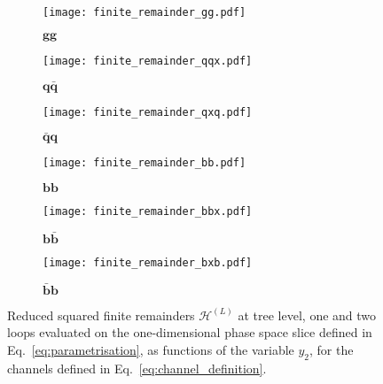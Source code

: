 \documentclass[main.tex]{subfiles}
\begin{document}
\begin{figure}[t!]
\centering
\begin{subfigure}{.5\textwidth}
    \centering
    \texttt{[image: finite\_remainder\_gg.pdf]}
    \label{fig:gg}
    \caption{$\mathbf{gg}$}
\end{subfigure}%
\begin{subfigure}{.5\textwidth}
    \centering
    \texttt{[image: finite\_remainder\_qqx.pdf]}
    \label{fig:qqx}
    \caption{$\mathbf{q\bar{q}}$}
\end{subfigure}
\begin{subfigure}{.5\textwidth}
    \centering
    \texttt{[image: finite\_remainder\_qxq.pdf]}
    \label{fig:qxq}
    \caption{$\mathbf{\bar{q}q}$}
\end{subfigure}%
\begin{subfigure}{.5\textwidth}
    \centering
    \texttt{[image: finite\_remainder\_bb.pdf]}
    \label{fig:bb}
    \caption{$\mathbf{bb}$}
\end{subfigure}
\begin{subfigure}{.5\textwidth}
    \centering
    \texttt{[image: finite\_remainder\_bbx.pdf]}
    \label{fig:bbx}
    \caption{$\mathbf{b\bar{b}}$}
\end{subfigure}%
\begin{subfigure}{.5\textwidth}
    \centering
    \texttt{[image: finite\_remainder\_bxb.pdf]}
    \label{fig:bxb}
    \caption{$\mathbf{\bar{b}b}$}
\end{subfigure}
\caption[short]{Reduced squared finite remainders $\mathcal{H}^{(L)}$ at tree level, one and two loops evaluated on the one-dimensional phase space slice defined 
in Eq.~\eqref{eq:parametrisation}, as functions of the variable $y_2$, for the channels defined in Eq.~\eqref{eq:channel_definition}.}
\label{fig:plots}
\end{figure}
\end{document}

